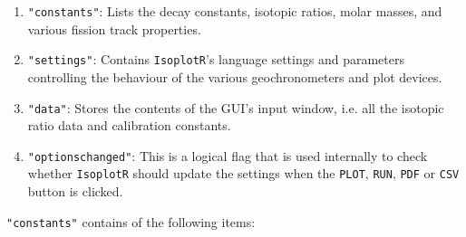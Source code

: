 \begin{refsection}
\begin{enumerate}
\item{\tt "constants"}: Lists the decay constants, isotopic ratios,
  molar masses, and various fission track properties.
\item{\tt "settings"}: Contains \texttt{IsoplotR}'s language
  settings and parameters controlling the behaviour of the various
  geochronometers and plot devices.
\item{\tt "data"}: Stores the contents of the GUI's input window,
  i.e. all the isotopic ratio data and calibration constants.
\item{\tt "optionschanged"}: This is a logical flag that is used
  internally to check whether \texttt{IsoplotR} should update the
  settings when the \texttt{PLOT}, \texttt{RUN}, \texttt{PDF} or
  \texttt{CSV} button is clicked.
\end{enumerate}

\noindent\texttt{"constants"} contains of the following items:


\end{refsection}
